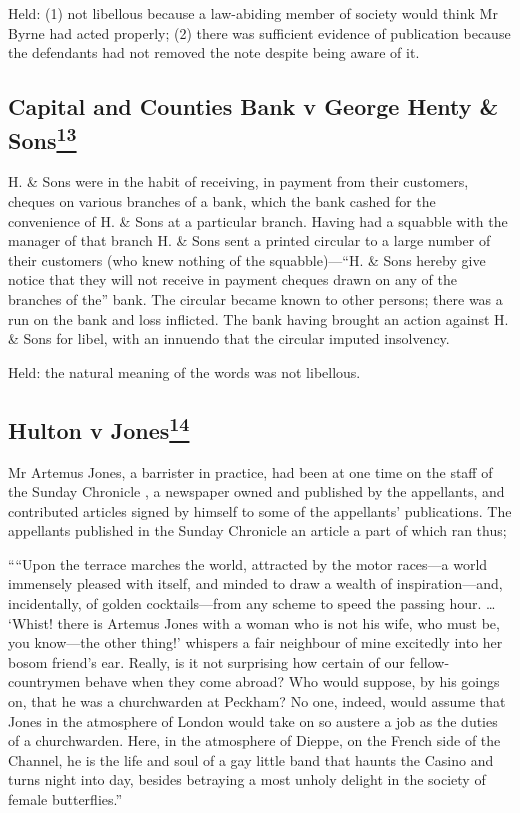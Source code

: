 \documentclass[]{article}
\begin{document}
Held: (1) not libellous because a law-abiding member of society would
think Mr Byrne had acted properly; (2) there was sufficient evidence of
publication because the defendants had not removed the note despite
being aware of it.

\subsection{\texorpdfstring{{{Capital and Counties Bank v George Henty
\&
Sons\hyperref[sdfootnote13sym]{\textsuperscript{13}}}}}{Capital and Counties Bank v George Henty \& Sons13}}

H. \& Sons were in the habit of receiving, in payment from their
customers, cheques on various branches of a bank, which the bank cashed
for the convenience of H. \& Sons at a particular branch. Having had a
squabble with the manager of that branch H. \& Sons sent a printed
circular to a large number of their customers (who knew nothing of the
squabble)---``H. \& Sons hereby give notice that they will not receive
in payment cheques drawn on any of the branches of the'' bank. The
circular became known to other persons; there was a run on the bank and
loss inflicted. The bank having brought an action against H. \& Sons for
libel, with an innuendo that the circular imputed insolvency.

Held: the natural meaning of the words was not libellous.

\subsection{\texorpdfstring{{{Hulton v
Jones\hyperref[sdfootnote14sym]{\textsuperscript{14}}}}}{Hulton v Jones14}}

Mr Artemus Jones, a barrister in practice, had been at one time on the
staff of the Sunday Chronicle , a newspaper owned and published by the
appellants, and contributed articles signed by himself to some of the
appellants' publications. The appellants published in the Sunday
Chronicle an article a part of which ran thus;

````Upon the terrace marches the world, attracted by the motor races---a
world immensely pleased with itself, and minded to draw a wealth of
inspiration---and, incidentally, of golden cocktails---from any scheme
to speed the passing hour. \ldots{} `Whist! there is Artemus Jones with
a woman who is not his wife, who must be, you know---the other thing!'
whispers a fair neighbour of mine excitedly into her bosom friend's ear.
Really, is it not surprising how certain of our fellow-countrymen behave
when they come abroad? Who would suppose, by his goings on, that he was
a churchwarden at Peckham? No one, indeed, would assume that Jones in
the atmosphere of London would take on so austere a job as the duties of
a churchwarden. Here, in the atmosphere of Dieppe, on the French side of
the Channel, he is the life and soul of a gay little band that haunts
the Casino and turns night into day, besides betraying a most unholy
delight in the society of female butterflies.''
\end{document}
